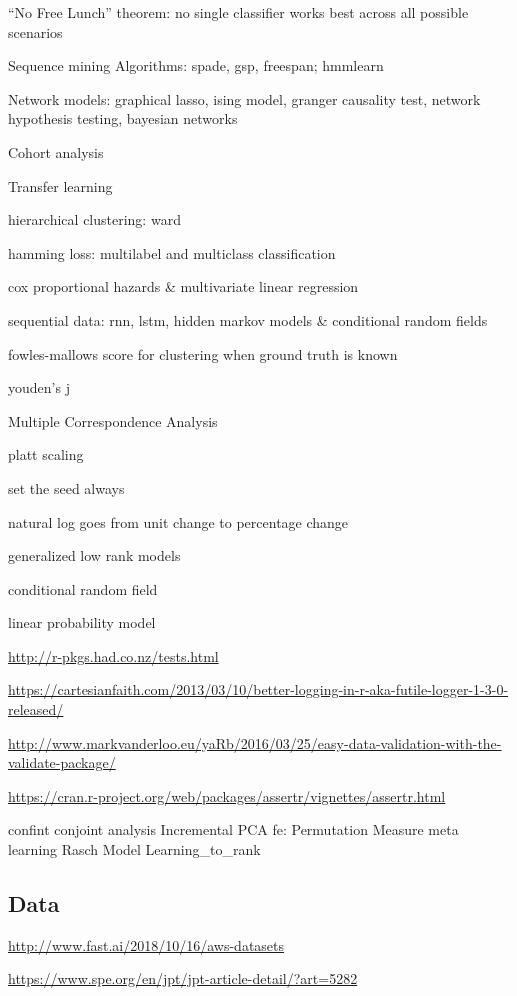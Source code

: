 \documentclass[]{book}
\begin{document}
``No Free Lunch'' theorem: no single classifier works best across all
possible scenarios

Sequence mining Algorithms: spade, gsp, freespan; hmmlearn

Network models: graphical lasso, ising model, granger causality test,
network hypothesis testing, bayesian networks

Cohort analysis

Transfer learning

hierarchical clustering: ward

hamming loss: multilabel and multiclass classification

cox proportional hazards \& multivariate linear regression

sequential data: rnn, lstm, hidden markov models \& conditional random
fields

fowles-mallows score for clustering when ground truth is known

youden's j

Multiple Correspondence Analysis

platt scaling

set the seed always

natural log goes from unit change to percentage change

generalized low rank models

conditional random field

linear probability model

\url{http://r-pkgs.had.co.nz/tests.html}

\url{https://cartesianfaith.com/2013/03/10/better-logging-in-r-aka-futile-logger-1-3-0-released/}

\url{http://www.markvanderloo.eu/yaRb/2016/03/25/easy-data-validation-with-the-validate-package/}

\url{https://cran.r-project.org/web/packages/assertr/vignettes/assertr.html}

confint conjoint analysis Incremental PCA fe: Permutation Measure meta
learning \textbar{} Rasch Model \textbar{} Learning\_to\_rank

\subsection{Data}\label{data}

\url{http://www.fast.ai/2018/10/16/aws-datasets}

\url{https://www.spe.org/en/jpt/jpt-article-detail/?art=5282}
\end{document}
